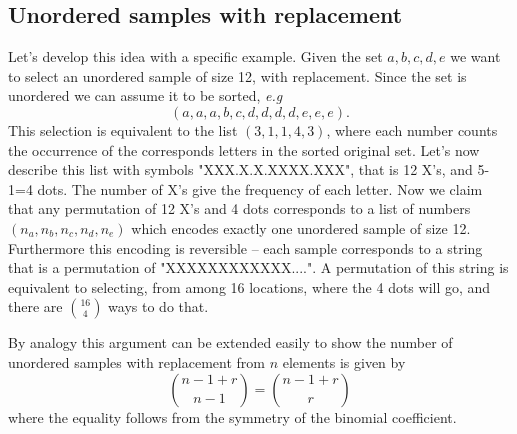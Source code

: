 \documentclass[../main.tex]{subfiles}
\begin{document}
\subsection{Unordered samples with replacement}
Let's develop this idea with a specific example. Given the set ${a,b,c,d,e}$ we want
to select an unordered sample of size 12, with replacement. Since the
set is unordered we can assume it to be sorted, \textit{e.g} 
	$$(a,a,a,b,c,d,d,d,d,e,e,e).$$
This selection is equivalent to the list $(3,1,1,4,3)$, where each number counts the occurrence
of the corresponds letters in the sorted original set. Let's now describe this list
with symbols "XXX.X.X.XXXX.XXX", that is 12 X's, and 5-1=4 dots. The number of X's 
give the frequency of each letter. Now we claim that any permutation
of 12 X's and 4 dots corresponds to a list of numbers $(n_a,n_b,n_c,n_d,n_e)$
which encodes exactly one unordered sample of size 12. Furthermore this encoding is reversible
-- each sample corresponds to a string that is a permutation of "XXXXXXXXXXXX....". 
A permutation of this string is equivalent to selecting, from among 16 locations,
where the 4 dots will go, and there are $\displaystyle {16 \choose 4}$ ways to do that.

By analogy this argument can be extended easily to show the number of unordered samples with replacement from $n$ elements is given by $${n-1+r \choose n-1} = {n-1+r \choose r}$$
where the equality follows from the symmetry of the binomial coefficient.
\end{document}

